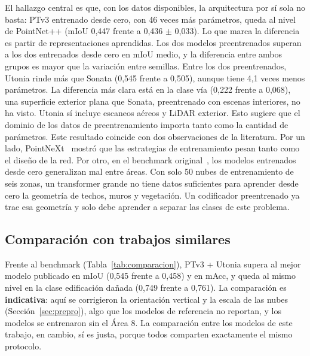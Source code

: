 \documentclass[5p]{elsarticle}
\begin{document}
El hallazgo central es que, con los datos disponibles, la arquitectura por sí sola no basta: PTv3 entrenado desde cero, con 46 veces más parámetros, queda al nivel de PointNet++ (mIoU 0,447 frente a 0,436 $\pm$ 0,033). Lo que marca la diferencia es partir de representaciones aprendidas. Los dos modelos preentrenados superan a los dos entrenados desde cero en mIoU medio, y la diferencia entre ambos grupos es mayor que la variación entre semillas. Entre los dos preentrenados, Utonia rinde más que Sonata (0,545 frente a 0,505), aunque tiene 4,1 veces menos parámetros. La diferencia más clara está en la clase vía (0,222 frente a 0,068), una superficie exterior plana que Sonata, preentrenado con escenas interiores, no ha visto. Utonia sí incluye escaneos aéreos y LiDAR exterior. Esto sugiere que el dominio de los datos de preentrenamiento importa tanto como la cantidad de parámetros. Este resultado coincide con dos observaciones de la literatura. Por un lado, PointNeXt~\cite{Qian2022} mostró que las estrategias de entrenamiento pesan tanto como el diseño de la red. Por otro, en el benchmark original~\cite{Le2026}, los modelos entrenados desde cero generalizan mal entre áreas. Con solo 50 nubes de entrenamiento de seis zonas, un transformer grande no tiene datos suficientes para aprender desde cero la geometría de techos, muros y vegetación. Un codificador preentrenado ya trae esa geometría y solo debe aprender a separar las clases de este problema.

\subsection{Comparación con trabajos similares}

Frente al benchmark (Tabla~\ref{tab:comparacion}), PTv3 + Utonia supera al mejor modelo publicado en mIoU (0,545 frente a 0,458) y en mAcc, y queda al mismo nivel en la clase edificación dañada (0,749 frente a 0,761). La comparación es \textbf{indicativa}: aquí se corrigieron la orientación vertical y la escala de las nubes (Sección~\ref{sec:prepro}), algo que los modelos de referencia no reportan, y los modelos se entrenaron sin el Área 8. La comparación entre los modelos de este trabajo, en cambio, sí es justa, porque todos comparten exactamente el mismo protocolo.
\end{document}
